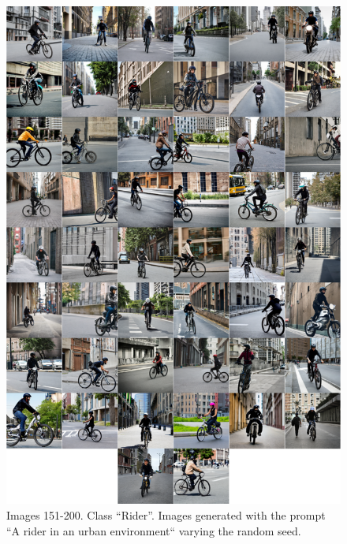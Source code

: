\begin{figure}
    \centering
    \includegraphics[width=1\columnwidth]{img/6-appendix/dataset_example_rider.pdf}
    \caption[Dataset images 151-200]{Images 151-200. Class ``Rider''.  Images generated with the prompt ``A rider in an urban environment`` varying the random seed.}
    \label{fig:dataset-rider}
\end{figure}
